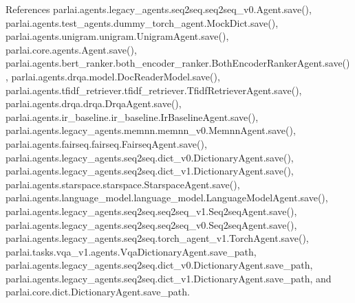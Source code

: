 References parlai.\+agents.\+legacy\+\_\+agents.\+seq2seq.\+seq2seq\+\_\+v0.\+Agent.\+save(), parlai.\+agents.\+test\+\_\+agents.\+dummy\+\_\+torch\+\_\+agent.\+Mock\+Dict.\+save(), parlai.\+agents.\+unigram.\+unigram.\+Unigram\+Agent.\+save(), parlai.\+core.\+agents.\+Agent.\+save(), parlai.\+agents.\+bert\+\_\+ranker.\+both\+\_\+encoder\+\_\+ranker.\+Both\+Encoder\+Ranker\+Agent.\+save(), parlai.\+agents.\+drqa.\+model.\+Doc\+Reader\+Model.\+save(), parlai.\+agents.\+tfidf\+\_\+retriever.\+tfidf\+\_\+retriever.\+Tfidf\+Retriever\+Agent.\+save(), parlai.\+agents.\+drqa.\+drqa.\+Drqa\+Agent.\+save(), parlai.\+agents.\+ir\+\_\+baseline.\+ir\+\_\+baseline.\+Ir\+Baseline\+Agent.\+save(), parlai.\+agents.\+legacy\+\_\+agents.\+memnn.\+memnn\+\_\+v0.\+Memnn\+Agent.\+save(), parlai.\+agents.\+fairseq.\+fairseq.\+Fairseq\+Agent.\+save(), parlai.\+agents.\+legacy\+\_\+agents.\+seq2seq.\+dict\+\_\+v0.\+Dictionary\+Agent.\+save(), parlai.\+agents.\+legacy\+\_\+agents.\+seq2seq.\+dict\+\_\+v1.\+Dictionary\+Agent.\+save(), parlai.\+agents.\+starspace.\+starspace.\+Starspace\+Agent.\+save(), parlai.\+agents.\+language\+\_\+model.\+language\+\_\+model.\+Language\+Model\+Agent.\+save(), parlai.\+agents.\+legacy\+\_\+agents.\+seq2seq.\+seq2seq\+\_\+v1.\+Seq2seq\+Agent.\+save(), parlai.\+agents.\+legacy\+\_\+agents.\+seq2seq.\+seq2seq\+\_\+v0.\+Seq2seq\+Agent.\+save(), parlai.\+agents.\+legacy\+\_\+agents.\+seq2seq.\+torch\+\_\+agent\+\_\+v1.\+Torch\+Agent.\+save(), parlai.\+tasks.\+vqa\+\_\+v1.\+agents.\+Vqa\+Dictionary\+Agent.\+save\+\_\+path, parlai.\+agents.\+legacy\+\_\+agents.\+seq2seq.\+dict\+\_\+v0.\+Dictionary\+Agent.\+save\+\_\+path, parlai.\+agents.\+legacy\+\_\+agents.\+seq2seq.\+dict\+\_\+v1.\+Dictionary\+Agent.\+save\+\_\+path, and parlai.\+core.\+dict.\+Dictionary\+Agent.\+save\+\_\+path.

